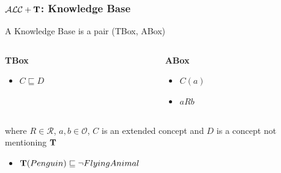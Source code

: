 \documentclass[serif,mathserif]{beamer}
\newcommand{\tip}{{\bf T}}
\newcommand{\alct}{\mathcal{ALC}+\tip}
\begin{document}
\begin{frame}
	\frametitle{$\alct$: Knowledge Base}
	A Knowledge Base is a pair (TBox, ABox)
	\begin{columns}[T]
	\begin{column}{5cm}
	\begin{block}{\textbf{TBox}}
	\begin{itemize}
		\item $C \sqsubseteq D$
	\end{itemize}
	\end{block}
	\end{column}
	
	\begin{column}{5cm}
	\begin{block}{\textbf{ABox}}
	\begin{itemize}
		\item $C(a)$
		\item $aRb$	
		\end{itemize}
	\end{block}
	\end{column}	
	\end{columns}
	\vspace{0.3cm}		
	where $R \in \mathcal{R}$, $a, b \in \mathcal{O}$, $C$ is an extended concept and $D$ is a concept not mentioning $\tip$
	
	\begin{example}
	
		\begin{itemize}
		\item $\tip(Penguin) \sqsubseteq \neg FlyingAnimal$
		\end{itemize}
		
	\end{example}
\end{frame}
\end{document}
